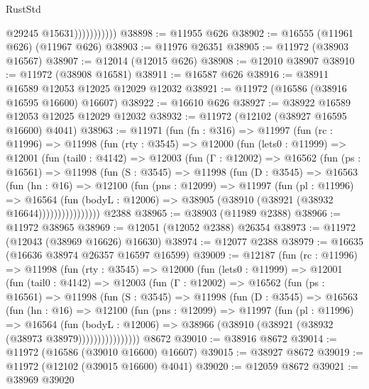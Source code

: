 \begin{lexlean}{RustStd}
\begin{coremodule}
                          @29245
                          @15631)))))))))))
@38898 := @11955 @626
@38902 := @16555 (@11961 @626) (@11967 @626)
@38903 := @11976 @26351
@38905 := @11972 (@38903 @16567)
@38907 := @12014 (@12015 @626)
@38908 := @12010 @38907
@38910 := @11972 (@38908 @16581)
@38911 := @16587 @626
@38916 := @38911 @16589 @12053 @12025 @12029 @12032
@38921 := @11972 (@16586 (@38916 @16595 @16600) @16607)
@38922 := @16610 @626
@38927 := @38922 @16589 @12053 @12025 @12029 @12032
@38932 := @11972 (@12102 (@38927 @16595 @16600) @4041)
@38963 := @11971
    (fun (fn : @316) =>
    @11997
      (fun (rc : @11996) =>
      @11998
        (fun (rty : @3545) =>
        @12000
          (fun (lets0 : @11999) =>
          @12001
            (fun (tail0 : @4142) =>
            @12003
              (fun (Γ : @12002) =>
              @16562
                (fun (ps : @16561) =>
                @11998
                  (fun (S : @3545) =>
                  @11998
                    (fun (D : @3545) =>
                    @16563
                      (fun (hn : @16) =>
                      @12100
                        (fun (pns : @12099) =>
                        @11997
                          (fun (pl : @11996) =>
                          @16564
                            (fun (bodyL : @12006) =>
                            @38905 (@38910 (@38921 (@38932 @16644))))))))))))))))
    @2388
@38965 := @38903 (@11989 @2388)
@38966 := @11972 @38965
@38969 := @12051 (@12052 @2388) @26354
@38973 := @11972 (@12043 (@38969 @16626) @16630)
@38974 := @12077 @2388
@38979 := @16635 (@16636 @38974 @26357 @16597 @16599)
@39009 := @12187
    (fun (rc : @11996) =>
    @11998
      (fun (rty : @3545) =>
      @12000
        (fun (lets0 : @11999) =>
        @12001
          (fun (tail0 : @4142) =>
          @12003
            (fun (Γ : @12002) =>
            @16562
              (fun (ps : @16561) =>
              @11998
                (fun (S : @3545) =>
                @11998
                  (fun (D : @3545) =>
                  @16563
                    (fun (hn : @16) =>
                    @12100
                      (fun (pns : @12099) =>
                      @11997
                        (fun (pl : @11996) =>
                        @16564
                          (fun (bodyL : @12006) =>
                          @38966 (@38910 (@38921 (@38932 (@38973 @38979))))))))))))))))
    @8672
@39010 := @38916 @8672
@39014 := @11972 (@16586 (@39010 @16600) @16607)
@39015 := @38927 @8672
@39019 := @11972 (@12102 (@39015 @16600) @4041)
@39020 := @12059 @8672
@39021 := @38969 @39020

\end{coremodule}
\end{lexlean}
